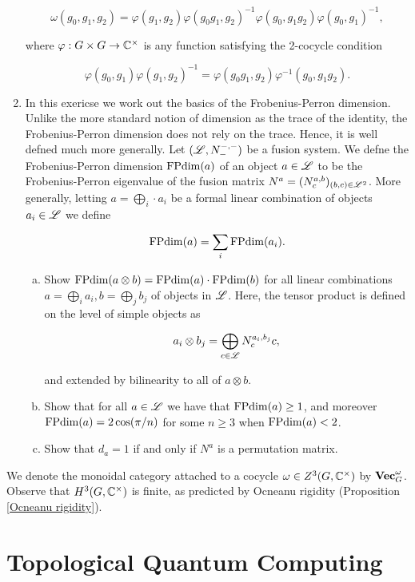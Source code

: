 \documentclass{article}
\theoremstyle{definition}
\numberwithin{figure}{section}
\begin{document}
\begin{enumerate}[\thesection .1.]
$$\omega(g_0,g_1,g_2)=\varphi(g_1,g_2)\varphi(g_0g_1,g_2)^{-1}\varphi(g_0,g_1g_2)\varphi(g_0,g_1)^{-1},$$

where $\varphi:G\times G\to \mathbb{C}^\times$ is any function satisfying the 2-cocycle condition

$$\varphi(g_0,g_1)\varphi(g_1,g_2)^{-1}=\varphi(g_0g_1,g_2)\varphi^{-1}(g_0,g_1g_2).$$

\item In this exericse we work out the basics of the Frobenius-Perron dimension. Unlike the more standard notion of dimension as the trace of the identity, the Frobenius-Perron dimension does not rely on the trace. Hence, it is well defned much more generally. Let $(\mathscr{L},N^{\--,\--}_{\--})$ be a fusion system. We defne the Frobenius-Perron dimension $\mathrm{FPdim}(a)$ of an object $a\in\mathscr{L}$ to be the Frobenius-Perron eigenvalue of the fusion matrix $N^a=(N^{a,b}_c)_{(b,c)\in\mathscr{L}^2}$. More generally, letting $a=\bigoplus_{i} \cdot a_i$ be a formal linear combination of objects $a_i\in\mathscr{L}$ we define

$$\mathrm{FPdim}(a)=\sum_i \mathrm{FPdim}(a_i).$$

\begin{enumerate}[(a)]
\item Show $\mathrm{FPdim}(a\otimes b)=\mathrm{FPdim}(a)\cdot\mathrm{FPdim}(b)$ for all linear combinations $a=\bigoplus_i a_i,b=\bigoplus_jb_j$ of objects in $\mathscr{L}$. Here, the tensor product is defined on the level of simple objects as

$$a_i\otimes b_j=\bigoplus_{c\in\mathscr{L}}N^{a_i,b_j}_{c} c,$$

and extended by bilinearity to all of $a\otimes b$.

\item Show that for all $a\in\mathscr{L}$ we have that $\mathrm{FPdim}(a)\geq 1$, and moreover $\mathrm{FPdim}(a)=2\cos(\pi/n)$ for some $n\geq 3$ when  $\mathrm{FPdim}(a)<2$.

\item Show that $d_a=1$ if and only if $N^a$ is a permutation matrix.
\end{enumerate}

\end{enumerate}
We denote the monoidal category attached to a cocycle $\omega\in Z^3(G,\mathbb{C}^\times)$ by $\bold{Vec}_G^\omega$. Observe that $H^3(G,\mathbb{C}^\times)$ is finite, as predicted by Ocneanu rigidity (Proposition \ref{Ocneanu rigidity}).

\section{Topological Quantum Computing}
\label{Topological Quantum Computing}
\end{document}
